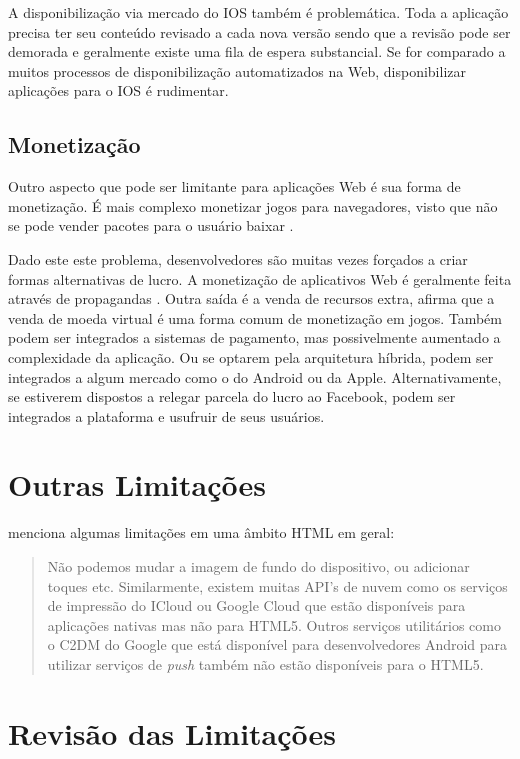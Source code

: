 A disponibilização via mercado do IOS também é problemática.
Toda a aplicação precisa ter seu conteúdo revisado a cada nova
versão sendo que a revisão pode ser demorada e geralmente existe uma
fila de espera substancial. Se for comparado a muitos processos de
disponibilização automatizados na Web, disponibilizar aplicações
para o IOS é rudimentar.

\subsection{Monetização}

Outro aspecto que pode ser limitante para aplicações Web é sua forma
de monetização. É mais complexo monetizar jogos para navegadores,
visto que não se pode vender pacotes para o usuário baixar
\autocite[p. 44]{gameCommunities}.

Dado este este problema, desenvolvedores são muitas vezes forçados
a criar formas alternativas de lucro. A monetização de aplicativos
Web é geralmente feita através de propagandas \autocite[p.
44]{gameCommunities}. Outra saída é a venda de recursos extra,
\citet[p. 44]{gameCommunities} afirma que a venda de moeda virtual
é uma forma comum de monetização em jogos. Também podem ser
integrados a sistemas de pagamento, mas possivelmente aumentado a
complexidade da aplicação. Ou se optarem pela arquitetura híbrida,
podem ser integrados a algum mercado como o do Android ou da Apple.
Alternativamente, se estiverem dispostos a relegar parcela do lucro
ao Facebook, podem ser integrados a plataforma e usufruir de seus
usuários.

\section{Outras Limitações}

\citet{html5Tradeoffs} menciona algumas limitações em uma âmbito HTML em geral:

\begin{quote}
Não podemos mudar a imagem de fundo do dispositivo, ou adicionar toques
etc. Similarmente, existem muitas API's de nuvem como os serviços
de impressão do ICloud ou Google Cloud que estão disponíveis para
aplicações nativas mas não para HTML5. Outros serviços utilitários
como o C2DM do Google que está disponível para desenvolvedores Android
para utilizar serviços de \textit{push} também não estão disponíveis
para o HTML5.
\end{quote}

\section{Revisão das Limitações}

